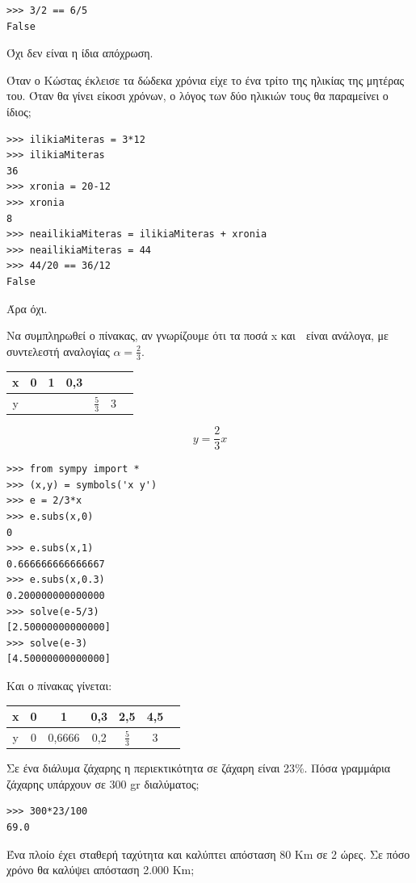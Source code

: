 \begin{lstlisting}
>>> 3/2 == 6/5
False
\end{lstlisting}
Όχι δεν είναι η ίδια απόχρωση.
\begin{exercise}
 Όταν ο Κώστας έκλεισε τα δώδεκα χρόνια είχε το ένα τρίτο της
ηλικίας της μητέρας του. Όταν θα γίνει είκοσι χρόνων, ο λόγος των
δύο ηλικιών τους θα παραμείνει ο ίδιος;
\end{exercise}
\begin{lstlisting}
>>> ilikiaMiteras = 3*12
>>> ilikiaMiteras
36
>>> xronia = 20-12
>>> xronia
8
>>> neailikiaMiteras = ilikiaMiteras + xronia
>>> neailikiaMiteras = 44
>>> 44/20 == 36/12
False
\end{lstlisting}
Άρα όχι.
\begin{exercise}
Να συμπληρωθεί ο πίνακας, αν γνωρίζουμε ότι τα ποσά x και 􀁜 είναι ανάλογα, με
συντελεστή αναλογίας $\alpha = \frac{2}{3}$.
\begin{table}
\begin{tabular}{|c|c|c|c|c|c|c}
\hline
x &0 &1 &0,3& &\\\hline
y &    &  &       & $\frac{5}{3}$ & 3\\\hline
\end{tabular}
\end{table}
\end{exercise}
$$
y = \frac{2}{3}x
$$
\begin{lstlisting}
>>> from sympy import *
>>> (x,y) = symbols('x y')
>>> e = 2/3*x
>>> e.subs(x,0)
0
>>> e.subs(x,1)
0.666666666666667
>>> e.subs(x,0.3)
0.200000000000000
>>> solve(e-5/3)
[2.50000000000000]
>>> solve(e-3)
[4.50000000000000]
\end{lstlisting}
Και ο πίνακας γίνεται:
\begin{table}
\begin{tabular}{|c|c|c|c|c|c|c}
\hline
x &0 &1 &0,3& 2,5&4,5\\\hline
y & 0   & 0,6666 & 0,2      & $\frac{5}{3}$ & 3\\\hline
\end{tabular}
\end{table}
\begin{exercise}
Σε ένα διάλυμα ζάχαρης η περιεκτικότητα σε ζάχαρη είναι 23\%. Πόσα γραμμάρια
ζάχαρης υπάρχουν σε 300 gr διαλύματος;
\end{exercise}
\begin{lstlisting}
>>> 300*23/100
69.0
\end{lstlisting}
\begin{exercise}
Ένα πλοίο έχει σταθερή ταχύτητα και καλύπτει απόσταση 80 Km σε 2 ώρες. Σε πόσο
χρόνο θα καλύψει απόσταση 2.000 Km;
\end{exercise}
